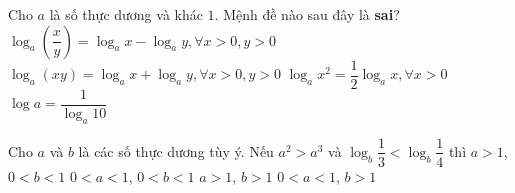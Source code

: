 \begin{ex}%
	Cho $a$ là  số thực dương và khác $1$. Mệnh đề nào sau đây là \textbf{sai}?
	 \choice
		{$\log_a\left(\dfrac{x}{y}\right)=\log_a x-\log_a y,\forall  x>0,y>0$}
		{$\log_a(xy)=\log_a  x+\log_a y,\forall x>0,y>0$}
		 {\True $\log_a x^2=\dfrac{1}{2}\log_a x,\forall x>0$}
		{$\log a=\dfrac{1}{\log_a 10}$} 
\end{ex}

\begin{ex}%
	Cho $a$ và $b$ là các số thực dương tùy ý. Nếu $a^2>a^3$ và  $\log_b\dfrac{1}{3}<\log_b\dfrac{1}{4}$ thì
	 \choice
		{\True  $a>1$, $0<b<1$}
		{$0<a<1$,  $0<b<1$}
		{$a>1$, $b>1$} 
		 {$0<a<1$, $b>1$}
\end{ex}

